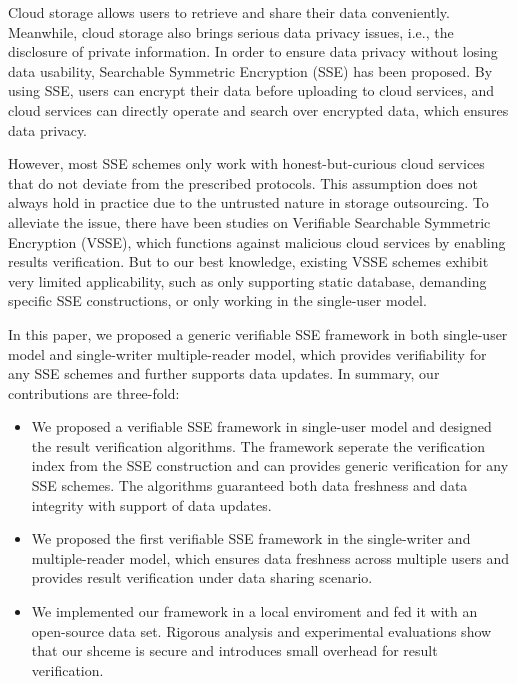\begin{eabstract}
  Cloud storage allows users to retrieve and share their data conveniently. %
  Meanwhile, cloud storage also brings serious data privacy issues, i.e., the disclosure of private information. In order to ensure data privacy without losing data usability,
  Searchable Symmetric Encryption (SSE) has been proposed. By using SSE, users can encrypt their data before uploading to cloud services, and cloud services can directly operate and search over encrypted data, which ensures data privacy.

  However, most SSE schemes only work with honest-but-curious cloud services that do not deviate from the prescribed protocols. This assumption does not always hold in practice due to the untrusted nature in storage outsourcing. To alleviate the issue, there have been studies on Verifiable Searchable Symmetric Encryption (VSSE), which functions against malicious cloud services by enabling results verification. But to our best knowledge, existing VSSE schemes exhibit very limited applicability, such as only supporting static database, demanding specific SSE constructions, or only working in the single-user model.

  In this paper, we proposed a generic verifiable SSE framework in both single-user model and single-writer multiple-reader model, which provides verifiability for any SSE schemes and further supports data updates. In summary, our contributions are three-fold:
  \begin{itemize}
    \item We proposed a verifiable SSE framework in single-user model and designed the result verification algorithms. The framework seperate the verification index from the SSE construction and can provides generic verification for any SSE schemes. The algorithms guaranteed both data freshness and data integrity with support of data updates.
    \item We proposed the first verifiable SSE framework in the single-writer and multiple-reader model, which ensures data freshness across multiple users and provides result verification under data sharing scenario.
    \item We implemented our framework in a local enviroment and fed it with an open-source data set. Rigorous analysis and experimental evaluations show that our shceme is secure and introduces small overhead for result verification.
  \end{itemize}
\end{eabstract}

